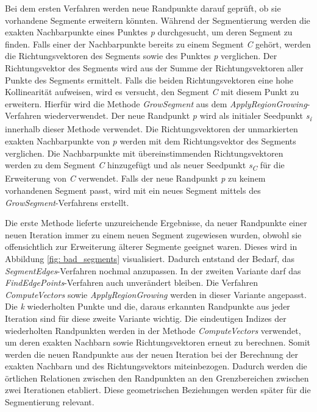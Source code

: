 Bei dem ersten Verfahren werden neue Randpunkte darauf geprüft, ob sie vorhandene Segmente erweitern könnten. Während der Segmentierung werden die exakten Nachbarpunkte eines Punktes \textit{p} durchgesucht, um deren Segment zu finden. Falls einer der Nachbarpunkte bereits zu einem Segment \textit{C} gehört, werden die Richtungsvektoren des Segments sowie des Punktes \textit{p} verglichen. Der Richtungsvektor des Segments wird aus der Summe der Richtungsvektoren aller Punkte des Segments ermittelt. Falls die beiden Richtungsvektoren eine hohe Kollinearität aufweisen, wird es versucht, den Segment \textit{C} mit diesem Punkt zu erweitern. Hierfür wird die Methode \textit{GrowSegment} aus dem \textit{ApplyRegionGrowing}-Verfahren wiederverwendet. Der neue Randpunkt \textit{p} wird als initialer Seedpunkt \textit{s\textsubscript{i}} innerhalb dieser Methode verwendet. Die Richtungsvektoren der unmarkierten exakten Nachbarpunkte von \textit{p} werden mit dem Richtungsvektor des Segments verglichen. Die Nachbarpunkte mit übereinstimmenden Richtungsvektoren werden zu dem Segment \textit{C} hinzugefügt und als neuer Seedpunkt \textit{s\textsubscript{C}} für die Erweiterung von \textit{C} verwendet. Falls der neue Randpunkt \textit{p} zu keinem vorhandenen Segment passt, wird mit ein neues Segment mittels des \textit{GrowSegment}-Verfahrens erstellt.

Die erste Methode lieferte unzureichende Ergebnisse, da neuer Randpunkte einer neuen Iteration immer zu einem neuen Segment zugewiesen wurden, obwohl sie offensichtlich zur Erweiterung älterer Segmente geeignet waren. Dieses wird in Abbildung \ref{fig: bad_segments} visualisiert. Dadurch entstand der Bedarf, das \textit{SegmentEdges}-Verfahren nochmal anzupassen. In der zweiten Variante darf das \textit{FindEdgePoints}-Verfahren auch unverändert bleiben. Die Verfahren \textit{ComputeVectors} sowie \textit{ApplyRegionGrowing} werden in dieser Variante angepasst. Die \textit{k} wiederholten Punkte und die, daraus erkannten Randpunkte aus jeder Iteration sind für diese zweite Variante wichtig. Die eindeutigen Indizes der wiederholten Randpunkten werden in der Methode \textit{ComputeVectors} verwendet, um deren exakten Nachbarn sowie Richtungsvektoren erneut zu berechnen. Somit werden die neuen Randpunkte aus der neuen Iteration bei der Berechnung der exakten Nachbarn und des Richtungsvektors miteinbezogen. Dadurch werden die örtlichen Relationen zwischen den Randpunkten an den Grenzbereichen zwischen zwei Iterationen etabliert. Diese geometrischen Beziehungen werden später für die Segmentierung relevant.

